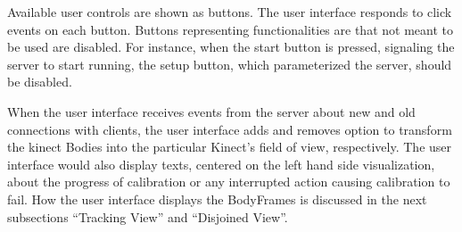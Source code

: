Available user controls are shown as buttons. The user interface responds to click events on each button. Buttons representing functionalities are that not meant to be used are disabled. For instance, when the start button is pressed, signaling the server to start running, the setup button, which parameterized the server, should be disabled.

When the user interface receives events from the server about new and old connections with clients, the user interface adds and removes option to transform the kinect Bodies into the particular Kinect's field of view, respectively. The user interface would also display texts, centered on the left hand side visualization, about the progress of calibration or any interrupted action causing calibration to fail. How the user interface displays the BodyFrames is discussed in the next subsections ``Tracking View'' and ``Disjoined View''. 

